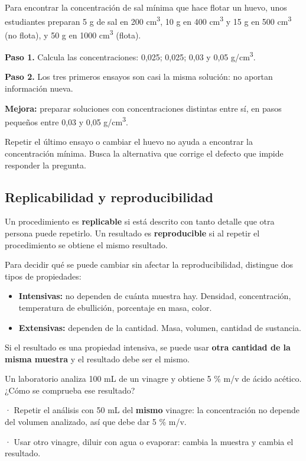 \begin{ejemplo} Para encontrar la concentración de sal mínima que hace flotar un huevo, unos estudiantes preparan 5 g de sal en 200 cm\textsuperscript{3}, 10 g en 400 cm\textsuperscript{3} y 15 g en 500 cm\textsuperscript{3} (no flota), y 50 g en 1000 cm\textsuperscript{3} (flota).\par \textbf{Paso 1.} Calcula las concentraciones: 0,025; 0,025; 0,03 y 0,05 g/cm\textsuperscript{3}.\par \textbf{Paso 2.} Los tres primeros ensayos son casi la misma solución: no aportan información nueva.\par \textbf{Mejora:} preparar soluciones con concentraciones distintas entre sí, en pasos pequeños entre 0,03 y 0,05 g/cm\textsuperscript{3}.\end{ejemplo}
 
\begin{ojo} Repetir el último ensayo o cambiar el huevo no ayuda a encontrar la concentración mínima. Busca la alternativa que corrige el defecto que impide responder la pregunta.\end{ojo}
\subsection{Replicabilidad y reproducibilidad}
Un procedimiento es \textbf{replicable} si está descrito con tanto detalle que otra persona puede repetirlo. Un resultado es \textbf{reproducible} si al repetir el procedimiento se obtiene el mismo resultado.

 

Para decidir qué se puede cambiar sin afectar la reproducibilidad, distingue dos tipos de propiedades:

 
\begin{itemize}
  \item \textbf{Intensivas:} no dependen de cuánta muestra hay. Densidad, concentración, temperatura de ebullición, porcentaje en masa, color.
  \item \textbf{Extensivas:} dependen de la cantidad. Masa, volumen, cantidad de sustancia.
\end{itemize}
 

Si el resultado es una propiedad intensiva, se puede usar \textbf{otra cantidad de la misma muestra} y el resultado debe ser el mismo.

  
\begin{ejemplo} Un laboratorio analiza 100 mL de un vinagre y obtiene 5 \% m/v de ácido acético. ¿Cómo se comprueba ese resultado?\par · Repetir el análisis con 50 mL del \textbf{mismo} vinagre: la concentración no depende del volumen analizado, así que debe dar 5 \% m/v. \par · Usar otro vinagre, diluir con agua o evaporar: cambia la muestra y cambia el resultado. \end{ejemplo}
 
